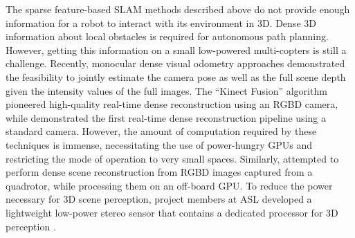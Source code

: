 The sparse feature-based SLAM methods described above do not provide enough information for a robot to interact with its environment in 3D. 
Dense 3D information about local obstacles is required for autonomous path planning.  However, getting this information on a small low-powered multi-copters is still a challenge.  Recently, monocular dense visual odometry approaches demonstrated the feasibility to jointly estimate the camera pose as well as the full scene depth given the intensity values of the full images. The ``Kinect Fusion'' algorithm \cite{newcombe2011kinectfusion} pioneered high-quality real-time dense reconstruction using an RGBD camera, while \cite{newcombe2011dtam} demonstrated the first real-time dense reconstruction pipeline using a standard camera. However, the amount of computation required by these techniques is immense, necessitating the use of power-hungry GPUs and restricting the mode of operation to very small spaces. Similarly, \cite{sturm2013uavg} attempted to perform dense scene reconstruction from RGBD images captured from a quadrotor, while processing them on an off-board GPU. To reduce the power necessary for 3D scene perception, project members at ASL developed a lightweight low-power stereo sensor that contains a dedicated processor for 3D perception \cite{nikolic_icra14}. 
